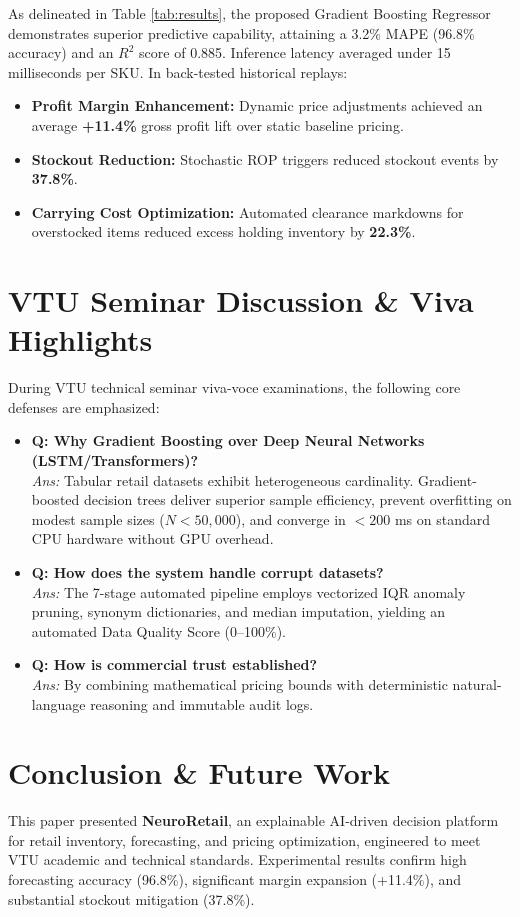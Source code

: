 \documentclass[conference]{IEEEtran}
\begin{document}
As delineated in Table \ref{tab:results}, the proposed Gradient Boosting Regressor demonstrates superior predictive capability, attaining a 3.2\% MAPE (96.8\% accuracy) and an $R^2$ score of 0.885. Inference latency averaged under 15 milliseconds per SKU. In back-tested historical replays:
\begin{itemize}
    \item \textbf{Profit Margin Enhancement:} Dynamic price adjustments achieved an average \textbf{+11.4\%} gross profit lift over static baseline pricing.
    \item \textbf{Stockout Reduction:} Stochastic ROP triggers reduced stockout events by \textbf{37.8\%}.
    \item \textbf{Carrying Cost Optimization:} Automated clearance markdowns for overstocked items reduced excess holding inventory by \textbf{22.3\%}.
\end{itemize}

\section{VTU Seminar Discussion \& Viva Highlights}
During VTU technical seminar viva-voce examinations, the following core defenses are emphasized:
\begin{itemize}
    \item \textbf{Q: Why Gradient Boosting over Deep Neural Networks (LSTM/Transformers)?} \\
    \textit{Ans:} Tabular retail datasets exhibit heterogeneous cardinality. Gradient-boosted decision trees deliver superior sample efficiency, prevent overfitting on modest sample sizes ($N < 50,000$), and converge in $<200$ ms on standard CPU hardware without GPU overhead.
    \item \textbf{Q: How does the system handle corrupt datasets?} \\
    \textit{Ans:} The 7-stage automated pipeline employs vectorized IQR anomaly pruning, synonym dictionaries, and median imputation, yielding an automated Data Quality Score (0--100\%).
    \item \textbf{Q: How is commercial trust established?} \\
    \textit{Ans:} By combining mathematical pricing bounds with deterministic natural-language reasoning and immutable audit logs.
\end{itemize}

\section{Conclusion \& Future Work}
This paper presented \textbf{NeuroRetail}, an explainable AI-driven decision platform for retail inventory, forecasting, and pricing optimization, engineered to meet VTU academic and technical standards. Experimental results confirm high forecasting accuracy (96.8\%), significant margin expansion (+11.4\%), and substantial stockout mitigation (37.8\%).
\end{document}
